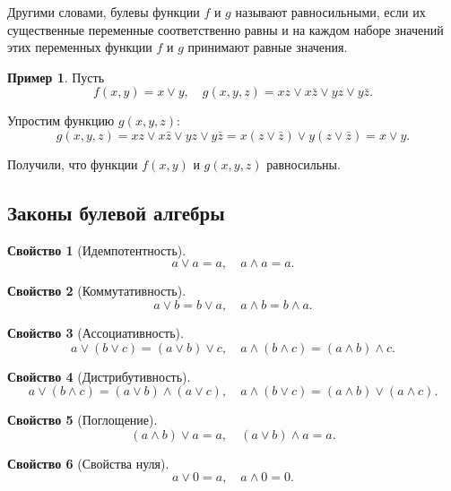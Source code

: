 \documentclass[a5paper, 11pt]{extarticle}
\theoremstyle{definition}
\newtheorem{property}{Свойство}[subsection]
\newtheorem*{example*}{Пример}
\theoremstyle{definition}
\theoremstyle{definition}
\numberwithin{figure}{section}
\numberwithin{table}{section}
\begin{document}
Другими словами, булевы функции \(f\) и \(g\) называют равносильными, если их существенные переменные соответственно равны и на каждом наборе значений этих переменных функции \(f\) и \(g\) принимают равные значения.

\begin{example*}
    Пусть
    \[
        f(x, y) = x \lor y,
        \quad
        g(x, y, z) = xz \lor x \bar{z} \lor yz \lor y \bar{z}.
    \]

    Упростим функцию \(g(x, y, z)\):
    \[
        g(x, y, z) =
        xz \lor x \bar{z} \lor yz \lor y \bar{z} =
        x(z \lor \bar{z}) \lor y(z \lor \bar{z}) =
        x \lor y.
    \]

    Получили, что функции \(f(x, y)\) и \(g(x, y, z)\) равносильны.
\end{example*}

\subsection{Законы булевой алгебры}

\begin{property}[Идемпотентность]
    \[
        a \lor a = a,
        \quad
        a \land a = a.
    \]
\end{property}

\begin{property}[Коммутативность]
    \[
        a \lor b = b \lor a,
        \quad
        a \land b = b \land a.
    \]
\end{property}

\begin{property}[Ассоциативность]
    \[
        a \lor (b \lor c) = (a \lor b) \lor c,
        \quad
        a \land (b \land c) = (a \land b) \land c.
    \]
\end{property}

\begin{property}[Дистрибутивность]
    \[
        a \lor (b \land c) = (a \lor b) \land (a \lor c),
        \quad
        a \land (b \lor c) = (a \land b) \lor (a \land c).
    \]
\end{property}

\begin{property}[Поглощение]
    \[
        (a \land b) \lor a = a,
        \quad
        (a \lor b) \land a = a.
    \]
\end{property}

\begin{property}[Свойства нуля]
    \[
        a \lor 0 = a,
        \quad
        a \land 0 = 0.
    \]
\end{property}
\end{document}
